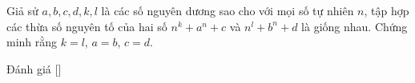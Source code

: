 \ifshowproblem
\begin{problem}\label{problem:IRN-2015-MO3-NP4}
	Giả sử $a, b, c, d, k, l$ là các số nguyên dương sao cho với mọi số tự nhiên $n$,
	tập hợp các thừa số nguyên tố của hai số $n^k + a^n + c$ và $n^l + b^n + d$ là giống nhau.  
	Chứng minh rằng $k = l$, $a = b$, $c = d$.
\end{problem}
\fi

\ifshowinfo
Đánh giá [\textbf{}]\footnotemark
{}
\fi